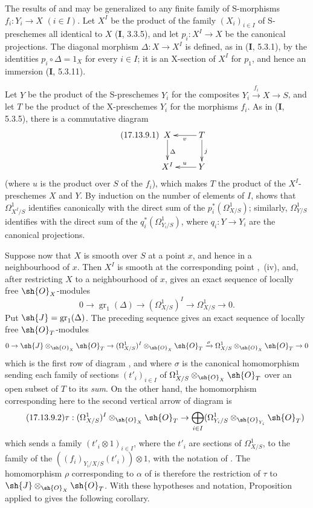 \begin{env}[17.13.9]
\label{IV.17.13.9}
The results of  and  may be generalized to any finite family of S-morphisms
$f_i:Y_i\to X$ $(i\in I)$.
Let $X^I$ be the product of the family $(X_i)_{i\in I}$ of S-preschemes all identical to $X$ (\textbf{I}, 3.3.5), and let $p_i:X^I\to X$ be the canonical projections.
The diagonal morphism $\Delta:X\to X^I$ is defined, as in (\textbf{I}, 5.3.1), by the identities $p_i\circ\Delta=1_X$ for every $i\in I$; it is an X-section of $X^I$ for $p_1$, and hence an immersion (\textbf{I}, 5.3.11).

Let $Y$ be the product of the S-preschemes $Y_i$ for the composites $Y_i\xrightarrow{f_i}X\to S$, and let $T$ be the product of the X-preschemes $Y_i$ for the morphisms $f_i$.
As in (\textbf{I}, 5.3.5), there is a commutative diagram
\[
\label{IV.17.13.9.1}
\tag{17.13.9.1}
\xymatrix{
  X \ar[d]^{\Delta} & T \ar[l]^{v} \ar[d]^{j} \\
  X^I & Y \ar[l]_{u}
}
\]
(where $u$ is the product over $S$ of the $f_i$), which makes $T$ the product of the $X^I$-preschemes $X$ and $Y$.
By induction on the number of elements of $I$,  shows that $\Omega^1_{X^I/S}$ identifies canonically with the direct sum of the $p_i^*(\Omega^1_{X/S})$; similarly, $\Omega^1_{Y/S}$ identifies with the direct sum of the $q_i^*(\Omega^1_{Y_i/S})$, where $q_i:Y\to Y_i$ are the canonical projections.

Suppose now that $X$ is smooth over $S$ at a point $x$, and hence in a neighbourhood of $x$.
Then $X^I$ is smooth at the corresponding point ,~(iv), and, after restricting $X$ to a neighbourhood of $x$,  gives an exact sequence of locally free $\sh{O}_X$-modules
\[
  0\to\operatorname{gr}_1(\Delta)\to(\Omega^1_{X/S})^I\to\Omega^1_{X/S}\to0.
\]
Put $\sh{J}=\operatorname{gr}_1(\Delta)$.
The preceding sequence gives an exact sequence of locally free $\sh{O}_T$-modules
\[
  0 \to \sh{J}\otimes_{\sh{O}_X}\sh{O}_T \to (\Omega^1_{X/S})^I\otimes_{\sh{O}_X}\sh{O}_T \xrightarrow{\sigma} \Omega^1_{X/S}\otimes_{\sh{O}_X}\sh{O}_T \to 0
\]
which is the first row of diagram , and where $\sigma$ is the canonical homomorphism sending each family of sections $(t'_i)_{i\in I}$ of $\Omega^1_{X/S}\otimes_{\sh{O}_X}\sh{O}_T$ over an open subset of $T$ to its \emph{sum}.
On the other hand, the homomorphism corresponding here to the second vertical arrow of diagram  is
\[
\label{IV.17.13.9.2}
\tag{17.13.9.2}
\tau: (\Omega^1_{X/S})^I\otimes_{\sh{O}_X}\sh{O}_T \to \bigoplus_{i\in I}(\Omega^1_{Y_i/S}\otimes_{\sh{O}_{Y_i}}\sh{O}_T)
\]
which sends a family $(t'_i\otimes1)_{i\in I}$, where the $t'_i$ are sections of $\Omega^1_{X/S}$, to the family of the
$((f_i)_{Y_i/X/S}(t'_i))\otimes1$, with the notation of .
The homomorphism $\rho$ corresponding to $\alpha$ of  is therefore the restriction of $\tau$ to $\sh{J}\otimes_{\sh{O}_X}\sh{O}_T$.
With these hypotheses and notation, Proposition  applied to  gives the following corollary.
\end{env}

